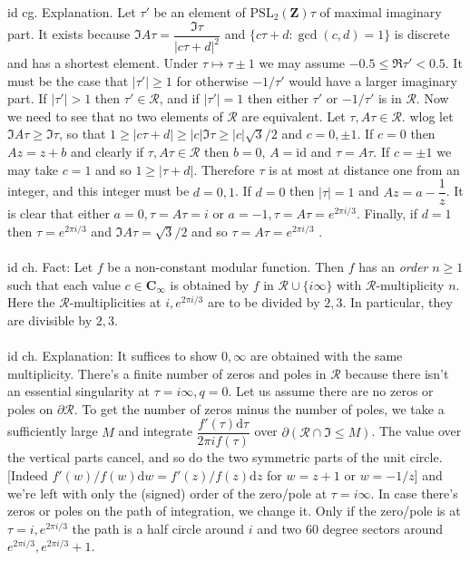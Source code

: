 \documentclass[oneside]{book}
\newcommand{\Z}{\mathbf{Z}}
\newcommand{\C}{\mathbf{C}}
\newcommand{\PSL}{\mathrm{PSL}}
\newcommand{\set}[1]{\{ #1\}}
\newcommand{\abs}[1]{\left\lvert #1\right\rvert}
\renewcommand{\d}{\mathrm{d}}
\newcommand{\id}{\mathrm{id}}
\newcommand{\RR}{\mathscr{R}}
\begin{document}
id cg. Explanation. Let $\tau'$ be an element of $\PSL_2(\Z)\tau$ of maximal imaginary part. It exists because $\Im A\tau= \dfrac{\Im \tau}{\abs{c\tau+d}^2}$ and $\set{c\tau+d: \gcd(c,d)=1}$ is discrete and has a shortest element. Under $\tau\mapsto \tau\pm1$ we may assume $-0.5\le \Re\tau'< 0.5$. It must be the case that $\abs{\tau'}\ge1$ for otherwise $-1/\tau'$ would have a larger imaginary part. If $\abs{\tau'}>1$ then $\tau'\in\RR$, and if $\abs{\tau'}=1$ then either $\tau'$ or $-1/\tau'$ is in $\RR$. Now we need to see that no two elements of $\RR$ are equivalent. Let $\tau,A\tau\in\RR$. wlog let $\Im A\tau\ge \Im \tau$, so that $1\ge \abs{c\tau+d}\ge \abs{c}\Im\tau\ge \abs{c}\sqrt{3}/2$ and $c=0,\pm1$. If $c=0$ then $Az=z+b$ and clearly if $\tau,A\tau\in\RR$ then $b=0$, $A=\id$ and $\tau=A\tau$. If $c=\pm1$ we may take $c=1$ and so $1\ge \abs{\tau+d}$. Therefore $\tau$ is at most at distance one from an integer, and this integer must be $d=0,1$. If $d=0$ then $\abs{\tau}=1$ and $Az=a-\dfrac{1}{z}$. It is clear that either $a=0, \tau=A\tau=i$ or $a=-1, \tau=A\tau=e^{2\pi i/3}$. Finally, if $d=1$ then $\tau=e^{2\pi i/3}$ and $\Im A\tau=\sqrt{3}/2$ and so $\tau=A\tau=e^{2\pi i/3}$ . \\\\


id ch. Fact: Let $f$ be a non-constant modular function. Then $f$ has an {\it order} $n\ge 1$ such that each value $c\in\C_\infty$ is obtained by $f$ in $\RR\cup\set{i\infty}$ with $\RR$-multiplicity $n$. Here the $\RR$-multiplicities at $i, e^{2\pi i/3}$ are to be divided by $2,3$. In particular, they are divisible by $2,3$.\\\\


id ch. Explanation: It suffices to show $0,\infty$ are obtained with the same multiplicity. There's a finite number of zeros and poles in $\RR$ because there isn't an essential singularity at $\tau=i\infty, q=0$. Let us assume there are no zeros or poles on $\partial\RR$. To get the number of zeros minus the number of poles, we take a sufficiently large $M$ and integrate $\dfrac{f'(\tau)\d \tau}{2\pi if(\tau)}$ over $\partial(\RR\cap \Im\le M)$. The value over the vertical parts cancel, and so do the two symmetric parts of the unit circle. [Indeed $f'(w)/f(w)\d w = f'(z)/f(z)\d z$ for $w=z+1$ or $w=-1/z$] and we're left with only the (signed) order of the zero/pole at $\tau=i\infty$. In case there's zeros or poles on the path of integration, we change it. Only if the zero/pole is at $\tau=i,e^{2\pi i/3}$ the path is a half circle around $i$ and two $60$ degree sectors around $e^{2\pi i/3}, e^{2\pi i/3}+1$.\\\\
\end{document}
